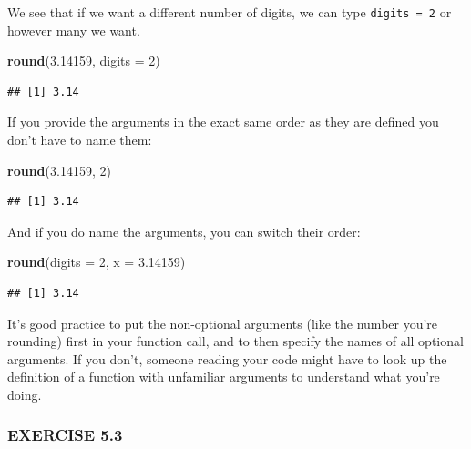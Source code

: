 \documentclass[
]{book}
\newenvironment{Shaded}{\begin{snugshade}}{\end{snugshade}}
\newcommand{\AttributeTok}[1]{\textcolor[rgb]{0.13,0.29,0.53}{#1}}
\newcommand{\DecValTok}[1]{\textcolor[rgb]{0.00,0.00,0.81}{#1}}
\newcommand{\FloatTok}[1]{\textcolor[rgb]{0.00,0.00,0.81}{#1}}
\newcommand{\FunctionTok}[1]{\textcolor[rgb]{0.13,0.29,0.53}{\textbf{#1}}}
\newcommand{\NormalTok}[1]{#1}
\begin{document}
We see that if we want a different number of digits, we can type \texttt{digits\ =\ 2} or however many we want.

\begin{Shaded}
\begin{Highlighting}[]
\FunctionTok{round}\NormalTok{(}\FloatTok{3.14159}\NormalTok{, }\AttributeTok{digits =} \DecValTok{2}\NormalTok{)}
\end{Highlighting}
\end{Shaded}

\begin{verbatim}
## [1] 3.14
\end{verbatim}

If you provide the arguments in the exact same order as they are defined you don't have to name them:

\begin{Shaded}
\begin{Highlighting}[]
\FunctionTok{round}\NormalTok{(}\FloatTok{3.14159}\NormalTok{, }\DecValTok{2}\NormalTok{)}
\end{Highlighting}
\end{Shaded}

\begin{verbatim}
## [1] 3.14
\end{verbatim}

And if you do name the arguments, you can switch their order:

\begin{Shaded}
\begin{Highlighting}[]
\FunctionTok{round}\NormalTok{(}\AttributeTok{digits =} \DecValTok{2}\NormalTok{, }\AttributeTok{x =} \FloatTok{3.14159}\NormalTok{)}
\end{Highlighting}
\end{Shaded}

\begin{verbatim}
## [1] 3.14
\end{verbatim}

It's good practice to put the non-optional arguments (like the number you're rounding) first in your function call, and to then specify the names of all optional arguments. If you don't, someone reading your code might have to look up the definition of a function with unfamiliar arguments to understand what you're doing.

\subsubsection*{EXERCISE 5.3}\label{exercise-5.3}
\end{document}
